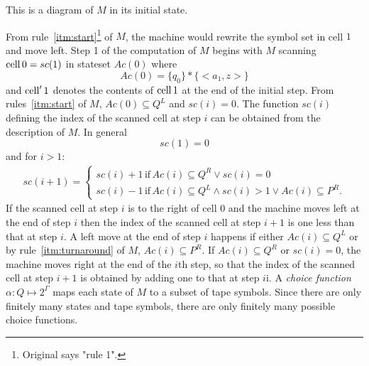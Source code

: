 \begin{aside}
%
    This is a diagram of $M$ in its initial state.
\begin{center}
\end{center}
\end{aside}

From rule~\ref{itm:start}\footnote{Original says "rule 1".}
of $M$, the machine would rewrite the symbol set in cell $1$ and move left.
Step 1 of the computation of $M$ begins with $M$ scanning $\mathrm{cell}\,0 = sc(1)$ in
stateset $Ac(0)$ where
\[
    Ac(0) = \{q_0\} * \{<a_1, z>\}
\]
and $\mathrm{cell}'\,1$ denotes the contents of $\mathrm{cell}\,1$ at the end of the initial step.
From rules~\ref{itm:start} of $M$, $Ac(0) \subseteq Q^L$ and $sc(i) = 0$.
The function $sc(i)$ defining the index of the scanned cell at step $i$ can
be obtained from the description of $M$.
In general
\[
    sc(1) = 0
\]
and for $i > 1$:
\begin{align*}
    sc(i+1) =
    \begin{cases}
        sc(i)+1 \,\mathrm{if}\,Ac(i) \subseteq Q^R \lor sc(i) = 0 \\
        sc(i)-1 \,\mathrm{if}\,Ac(i) \subseteq Q^L \land sc(i) > 1 \lor Ac(i) \subseteq P^R.
    \end{cases}
\end{align*}
If the scanned cell at step $i$ is to the right of cell $0$ and the machine moves
left at the end of step $i$ then the index of the scanned cell at step $i+1$
is one less than that at step $i$.
A left move at the end of step $i$ happens
if either $Ac(i) \subseteq Q^L$ or by rule~\ref{itm:turnaround} of $M$,
$Ac(i) \subseteq P^R$.
If $Ac(i) \subseteq Q^R$ or $sc(i) = 0$, the machine moves right at the end of the
$i$th step, so that the index of the scanned cell at step $i+1$ is obtained by
adding one to that at step $i$i.
A \emph{choice function} $\alpha : Q \mapsto 2^\Gamma$ maps each state of $M$ to
a subset of tape symbols.
Since there are only finitely many states and tape symbols, there are only
finitely many possible choice functions.

